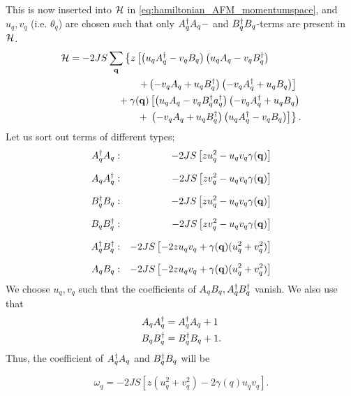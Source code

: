 This is now inserted into $\mathcal{H}$ in \cref{eq:hamiltonian_AFM_momentumspace}, and $u_{q},v_{q}$ (i.e. $\theta_{q}$) are chosen such that only $A_{q}^{\dagger}A_{q}-$ and $B_{q}^{\dagger}B_{q}$-terms are present in $\mathcal{H}$.
\begin{align*}
	\mathcal{H} &= -2JS\sum_{\vb{q}}\left \{z\left [\left (u_{q}A_{q}^{\dagger}-v_{q}B_{q}\right )\left (u_{q}A_{q}-v_{q}B_{q}^{\dagger}\right )\right .\right. \\
	&\qquad\qquad\qquad\quad \left . + \left (-v_{q}A_{q} + u_{q}B_{q}^{\dagger}\right )\left ( -v_{q}A_{q}^{\dagger} + u_{q}B_{q}\right )\right ] \\
	&\qquad\qquad\quad +\gamma(\vb{q})\left [\left (u_{q}A_{q}-v_{q}B_{q}^{\dagger}  a_{q}^{\dagger}\right )\left (-v_{q}A_{q}^{\dagger} + u_{q}B_{q}\right )\right .\\
	&\qquad\qquad\qquad\quad + \left .\left .\left (-v_{q}A_{q} + u_{q}B_{q}^{\dagger}\right )\left (u_{q}A_{q}^{\dagger}-v_{q}B_{q}\right ) \right ]\right \}.
\end{align*}
Let us sort out terms of different types;
\begin{align*}
	A_{q}^{\dagger}A_{q}: &&-2JS\left [zu_{q}^2 - u_{q}v_{q}\gamma(\vb{q})\right ] \\[1.5ex]
	A_{q}A_{q}^{\dagger}: && -2JS\left [zv_{q}^2 - u_{q}v_{q}\gamma(\vb{q})\right ] \\[1.5ex]
	B_{q}^{\dagger}B_{q}: && -2JS\left [zu_{q}^2 - u_{q}v_{q}\gamma(\vb{q})\right ] \\[1.5ex]
	B_{q}B_{q}^{\dagger}: && -2JS\left [zv_{q}^2 - u_{q}v_{q}\gamma(\vb{q})\right ] \\[1.5ex]
	A_{q}^{\dagger}B_{q}^{\dagger}: && -2JS\left [-2zu_{q}v_{q} + \gamma(\vb{q})(u_{q}^2  + v_{q}^2)\right ]\\[1.5ex]
	A_{q}B_{q}: && -2JS\left [-2zu_{q}v_{q} + \gamma(\vb{q})(u_{q}^2  + v_{q}^2)\right ]
\end{align*}
We choose $u_{q}, v_{q}$ such that the coefficients of $A_{q}B_{q}, A_{q}^{\dagger}B_{q}^{\dagger}$ vanish. We also use that 
\begin{align}
A_{q}A_{q}^{\dagger} &= A_{q}^{\dagger}A_{q} + 1 \\
B_{q}B_{q}^{\dagger} &= B_{q}^{\dagger}B_{q} + 1.
\end{align}
Thus, the coefficient of $A_{q}^{\dagger}A_{q}$ and $B_{q}^{\dagger}B_{q}$ will be
\begin{tcolorbox}
	\begin{equation}
		\omega_q = -2JS\left [z(u_{q}^2 + v_{q}^2)-2\gamma(q)u_{q}v_{q}\right ].
	\end{equation}                         
\end{tcolorbox}
